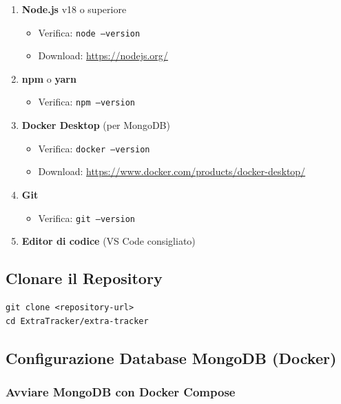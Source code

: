 \documentclass[11pt,a4paper]{article}
\newcommand{\code}[1]{\texttt{#1}}
\begin{document}
\begin{enumerate}
    \item \textbf{Node.js} v18 o superiore
    \begin{itemize}
        \item Verifica: \code{node --version}
        \item Download: \url{https://nodejs.org/}
    \end{itemize}
    
    \item \textbf{npm} o \textbf{yarn}
    \begin{itemize}
        \item Verifica: \code{npm --version}
    \end{itemize}
    
    \item \textbf{Docker Desktop} (per MongoDB)
    \begin{itemize}
        \item Verifica: \code{docker --version}
        \item Download: \url{https://www.docker.com/products/docker-desktop/}
    \end{itemize}
    
    \item \textbf{Git}
    \begin{itemize}
        \item Verifica: \code{git --version}
    \end{itemize}
    
    \item \textbf{Editor di codice} (VS Code consigliato)
\end{enumerate}

\subsection{Clonare il Repository}

\begin{lstlisting}[caption=Clonare Repository]
git clone <repository-url>
cd ExtraTracker/extra-tracker
\end{lstlisting}

\subsection{Configurazione Database MongoDB (Docker)}

\subsubsection{Avviare MongoDB con Docker Compose}
\end{document}
